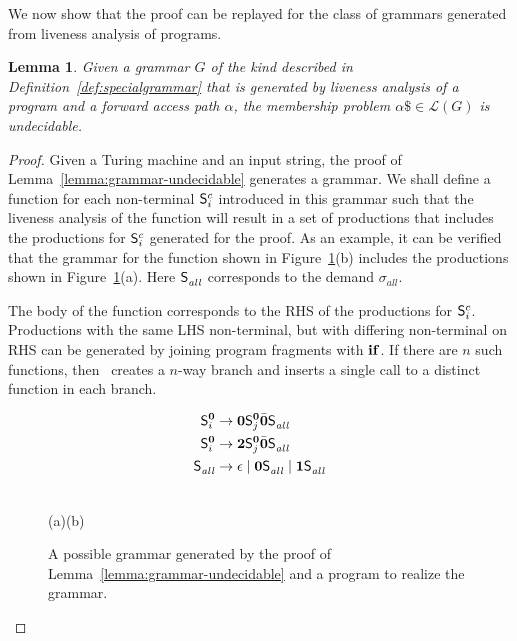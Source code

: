 \documentclass[9pt,preprint,nonatbib]{sigplanconf}
\newtheorem{lemma}[theorem]{Lemma}
\begin{document}
We now show that the proof can be replayed for the class of grammars
generated from liveness analysis of programs. 

\begin{lemma}\label{lemma:grammar-from-analysis-undecidable}
Given   a    grammar    $G$    of   the    kind    described    in
Definition~\ref{def:specialgrammar}  that  is  generated  by  liveness
analysis  of a  program  and  a forward  access  path $\alpha$,    the
membership problem $\alpha\$ \in \mathscr{L}(G)$ is undecidable.
\end{lemma} 

\begin{proof}
Given a Turing machine and an input string, the  proof   of
Lemma~\ref{lemma:grammar-undecidable} generates a grammar. 
We shall define a function
for   each  non-terminal $\mathsf{S}_{i}^{c}$   introduced  in   this grammar
such that the
liveness  analysis  of  the function will  result
in a set of productions that includes the productions for
$\mathsf{S}_{i}^{c}$ generated for the proof.
As an example, it  can be verified that the grammar
for the function shown in Figure~\ref{fig:turing-pgm}(b)    includes      the
productions shown in Figure~\ref{fig:turing-pgm}(a). Here $\mathsf{S}_{\mathit{all}}^{}$   corresponds   to  the   demand
$\sigma_{\mathit{all}}$.
 
The body of the function corresponds  to the RHS of the productions
for $\mathsf{S}_{i}^{c}$. Productions with the same  LHS non-terminal, but
with differing non-terminal on RHS can be generated by 
joining program fragments with $\mbox{$\mathbf{ if}$}$.   If  there  are  $n$ such  functions,  then
\mainpgm\ creates  a $n$-way  branch and  inserts a  single call  to a
distinct function in each branch.

\begin{figure}[t]
  \begin{minipage}{.45\columnwidth}
    \begin{align*}
      \mathsf{S}_{i}^{\mathbf{0}} &\rightarrow \mathbf{0}\mathsf{S}_{j}^{\mathbf{0}}\bar{\mathbf{0}}\mathsf{S}_{\mathit{all}}^{} \\
      \mathsf{S}_{i}^{\mathbf{0}} &\rightarrow {\mathbf{2}}\mathsf{S}_{j}^{\mathbf{0}}\bar{\mathbf{0}}\mathsf{S}_{\mathit{all}}^{} \\
      \mathsf{S}_{\mathit{all}}^{} &\rightarrow \epsilon \mid \mathbf{0}\mathsf{S}_{\mathit{all}}^{} \mid
      \mathbf{1}\mathsf{S}_{\mathit{all}}^{}
    \end{align*}
  \end{minipage}
  \begin{minipage}{.45\columnwidth}
    
  \end{minipage}\\
  \mbox{}\hfill(a)\hfill(b)\hfill\mbox{}
  \caption{A possible grammar generated by the proof of
    Lemma~\ref{lemma:grammar-undecidable} and a program to realize the
  grammar.}\label{fig:turing-pgm}
\end{figure}


\end{proof}
\end{document}
